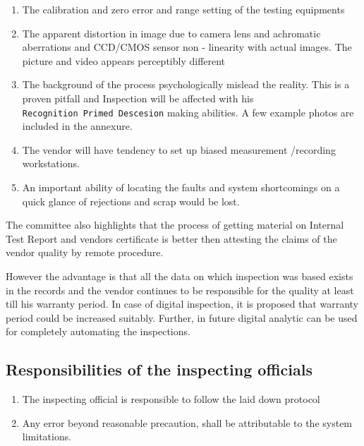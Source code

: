 \documentclass[
]{article}
\providecommand{\tightlist}{%
  \setlength{\itemsep}{0pt}\setlength{\parskip}{0pt}}
\begin{document}
\begin{enumerate}
\def\labelenumi{\arabic{enumi}.}
\tightlist
\item
  The calibration and zero error and range setting of the testing
  equipments
\item
  The apparent distortion in image due to camera lens and achromatic
  aberrations and CCD/CMOS sensor non - linearity with actual images.
  The picture and video appears perceptibly different
\item
  The background of the process psychologically mislead the reality.
  This is a proven pitfall and Inspection will be affected with his
  \texttt{Recognition\ Primed\ Descesion} making abilities. A few
  example photos are included in the annexure.
\item
  The vendor will have tendency to set up biased measurement /recording
  workstations.
\item
  An important ability of locating the faults and system shortcomings on
  a quick glance of rejections and scrap would be lost.
\end{enumerate}

The committee also highlights that the process of getting material on
Internal Test Report and vendors certificate is better then attesting
the claims of the vendor quality by remote procedure.

However the advantage is that all the data on which inspection was based
exists in the records and the vendor continues to be responsible for the
quality at least till his warranty period. In case of digital
inspection, it is proposed that warranty period could be increased
suitably. Further, in future digital analytic can be used for completely
automating the inspections.

\hypertarget{responsibilities-of-the-inspecting-officials}{%
\subsection{Responsibilities of the inspecting
officials}\label{responsibilities-of-the-inspecting-officials}}

\begin{enumerate}
\def\labelenumi{\arabic{enumi}.}
\tightlist
\item
  The inspecting official is responsible to follow the laid down
  protocol
\item
  Any error beyond reasonable precaution, shall be attributable to the
  system limitations.
\end{enumerate}
\end{document}

